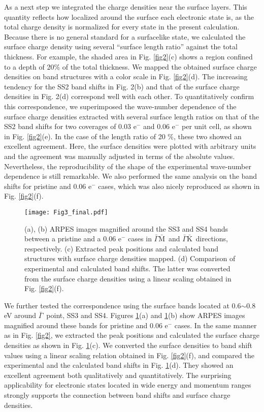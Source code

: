 \documentclass[reprint,secnumarabic,amssymb, nobibnotes, aps, prl,superscriptaddress,showpacs]{revtex4-1}
\def\gb{$\bar{\Gamma}$\ }
\def\gmb{${\bar{\Gamma}}{\bar{\mathrm{M}}}$\ }
\def\gkb{${\bar{\Gamma}}{\bar{\mathrm{K}}}$\ }
\begin{document}
As a next step we integrated the charge densities near the surface layers. This quantity reflects how localized around the surface each electronic state is, as the total charge density is normalized for every state in the present calculation. Because there is no general standard for a surfacelike state, we calculated the surface charge density using several ``surface length ratio'' against the total thickness. For example, the shaded area in Fig. \ref{fig2}(c) shows a region confined to a depth of 20\% of the total thickness. We mapped the obtained surface charge densities on band structures with a color scale in Fig. \ref{fig2}(d). The increasing tendency for the SS2 band shifts in Fig. 2(b) and that of the surface charge densities in Fig. 2(d) correspond well with each other. To quantitatively confirm this correspondence, we superimposed the wave-number dependence of the surface charge densities extracted with several surface length ratios on that of the SS2 band shifts for two coverages of 0.03 e$^-$ and 0.06 e$^-$ per unit cell, as shown in Fig. \ref{fig2}(e). In the case of the length ratio of 20 \%, these two showed an excellent agreement. Here, the surface densities were plotted with arbitrary units and the agreement was manually adjusted in terms of the absolute values. Nevertheless, the reproducibility of the shape of the experimental wave-number dependence is still remarkable. We also performed the same analysis on the band shifts for pristine and 0.06 e$^-$ cases, which was also nicely reproduced as shown in Fig. \ref{fig2}(f).

\begin{figure}
\texttt{[image: Fig3\_final.pdf]}
\caption{\label{fig3}(a), (b) ARPES images magnified around the SS3 and SS4 bands between a pristine and a 0.06 e$^-$ cases in \gmb and \gkb directions, respectively. (c) Extracted peak positions and calculated band structures with surface charge densities mapped. (d) Comparison of experimental and calculated band shifts. The latter was converted from the surface charge densities using a linear scaling obtained in Fig. \ref{fig2}(f).}	
\end{figure}

We further tested the correspondence using the surface bands located at 0.6$\sim$0.8 eV around \gb point, SS3 and SS4. Figures \ref{fig3}(a) and \ref{fig3}(b) show ARPES images magnified around these bands for pristine and 0.06 e$^-$ cases. In the same manner as in Fig. \ref{fig2}, we extracted the peak positions and calculated the surface charge densities as shown in Fig. \ref{fig3}(c). We converted the surface densities to band shift values using a linear scaling relation obtained in Fig. \ref{fig2}(f), and compared the experimental and the calculated band shifts in Fig. \ref{fig3}(d). They showed an excellent agreement both qualitatively and quantitatively. The surprising applicability for electronic states located in wide energy and momentum ranges strongly supports the connection between band shifts and surface charge densities.
\end{document}
